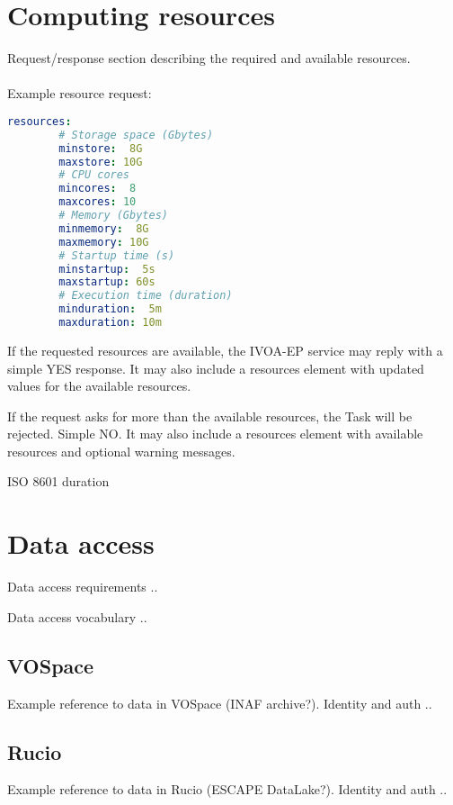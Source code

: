 \documentclass[11pt,a4paper]{ivoa}
\newcommand{\ivoep} {IVOA-EP\xspace}
\begin{document}
\section{Computing resources}
\label{sec:computing-resources}

Request/response section describing the required and available resources.
\\
\\
Example resource request:
\begin{lstlisting}[language=yaml]
    resources:
        # Storage space (Gbytes)
        minstore:  8G
        maxstore: 10G
        # CPU cores
        mincores:  8
        maxcores: 10
        # Memory (Gbytes)
        minmemory:  8G
        maxmemory: 10G
        # Startup time (s)
        minstartup:  5s
        maxstartup: 60s
        # Execution time (duration)
        minduration:  5m
        maxduration: 10m
\end{lstlisting}

If the requested resources are available, the \ivoep service may reply with a simple YES response. It may also include a resources element with updated values for the available resources.


If the request asks for more than the available resources, the Task will be rejected.
Simple NO. It may also include a resources element with available resources and optional warning messages.

ISO 8601 duration

\section{Data access}
\label{sec:data-access}

Data access requirements ..

Data access vocabulary ..

\subsection{VOSpace}
\label{sec:data-access-vospace}

Example reference to data in VOSpace (INAF archive?).
Identity and auth ..

\subsection{Rucio}
\label{sec:data-access-rucio}

Example reference to data in Rucio (ESCAPE DataLake?).
Identity and auth ..
\end{document}
